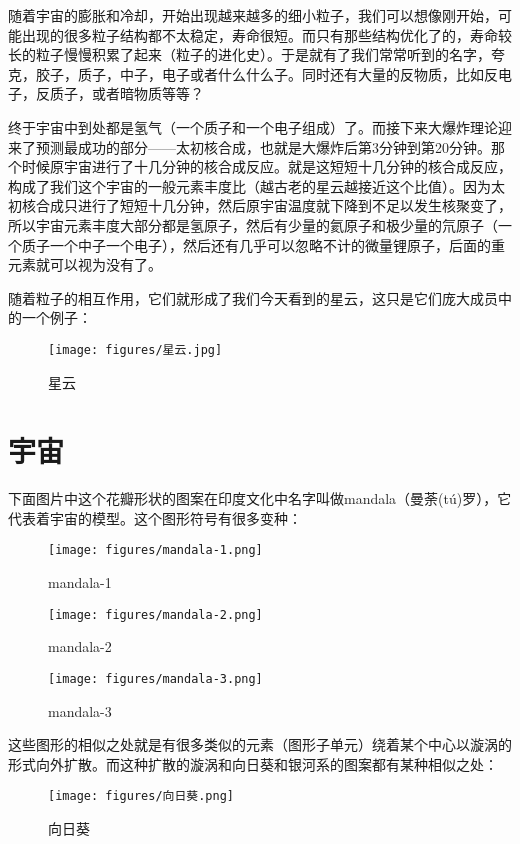 \documentclass[11pt,oneside]{article}
\begin{document}
随着宇宙的膨胀和冷却，开始出现越来越多的细小粒子，我们可以想像刚开始，可能出现的很多粒子结构都不太稳定，寿命很短。而只有那些结构优化了的，寿命较长的粒子慢慢积累了起来（粒子的进化史）。于是就有了我们常常听到的名字，夸克，胶子，质子，中子，电子或者什么什么子。同时还有大量的反物质，比如反电子，反质子，或者暗物质等等？

终于宇宙中到处都是氢气（一个质子和一个电子组成）了。而接下来大爆炸理论迎来了预测最成功的部分——太初核合成，也就是大爆炸后第3分钟到第20分钟。那个时候原宇宙进行了十几分钟的核合成反应。就是这短短十几分钟的核合成反应，构成了我们这个宇宙的一般元素丰度比（越古老的星云越接近这个比值）。因为太初核合成只进行了短短十几分钟，然后原宇宙温度就下降到不足以发生核聚变了，所以宇宙元素丰度大部分都是氢原子，然后有少量的氦原子和极少量的氘原子（一个质子一个中子一个电子），然后还有几乎可以忽略不计的微量锂原子，后面的重元素就可以视为没有了。

随着粒子的相互作用，它们就形成了我们今天看到的星云，这只是它们庞大成员中的一个例子：

\begin{figure}[H]
\centering
\texttt{[image: figures/星云.jpg]}
\caption{星云}
\end{figure}


\section{宇宙}
\label{sec-3}
下面图片中这个花瓣形状的图案在印度文化中名字叫做mandala（曼荼(tú)罗），它代表着宇宙的模型。这个图形符号有很多变种：

\begin{figure}[H]
\centering
\texttt{[image: figures/mandala-1.png]}
\caption{mandala-1}
\end{figure}
\begin{figure}[H]
\centering
\texttt{[image: figures/mandala-2.png]}
\caption{mandala-2}
\end{figure}
\begin{figure}[H]
\centering
\texttt{[image: figures/mandala-3.png]}
\caption{mandala-3}
\end{figure}


这些图形的相似之处就是有很多类似的元素（图形子单元）绕着某个中心以漩涡的形式向外扩散。而这种扩散的漩涡和向日葵和银河系的图案都有某种相似之处：
\begin{figure}[H]
\centering
\texttt{[image: figures/向日葵.png]}
\caption{向日葵}
\end{figure}
\end{document}
